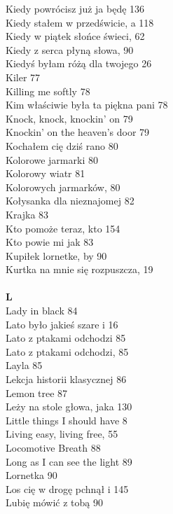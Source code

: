 \documentclass[a5paper, 10pt]{book}
\begin{document}
{\begin{multicols}{3}
    Kiedy powrócisz już ja będę 136\\
    Kiedy stałem w przedświcie, a 118\\
    Kiedy w piątek słońce świeci, 62\\
    Kiedy z serca płyną słowa, 90\\
    Kiedyś byłam różą dla twojego 26\\
    Kiler 77\\
    Killing me softly 78\\
    Kim właściwie była ta piękna pani 78\\
    Knock, knock, knockin' on 79\\
    Knockin' on the heaven's door 79\\
    Kochałem cię dziś rano 80\\
    Kolorowe jarmarki 80\\
    Kolorowy wiatr 81\\
    Kolorowych jarmarków, 80\\
    Kołysanka dla nieznajomej 82\\
    Krajka 83\\
    Kto pomoże teraz, kto 154\\
    Kto powie mi jak 83\\
    Kupiłek lornetke, by 90\\
    Kurtka na mnie się rozpuszcza, 19\\
    \\
    {\footnotesize \textbf{L\\} }
    Lady in black 84\\
    Lato było jakieś szare i 16\\
    Lato z ptakami odchodzi 85\\
    Lato z ptakami odchodzi, 85\\
    Layla 85\\
    Lekcja historii klasycznej 86\\
    Lemon tree 87\\
    Leży na stole głowa, jaka 130\\
    Little things I should have 8\\
    Living easy, living free, 55\\
    Locomotive Breath 88\\
    Long as I can see the light 89\\
    Lornetka 90\\
    Los cię w drogę pchnął i 145\\
    Lubię mówić z tobą 90\\

\end{multicols}}
\end{document}
